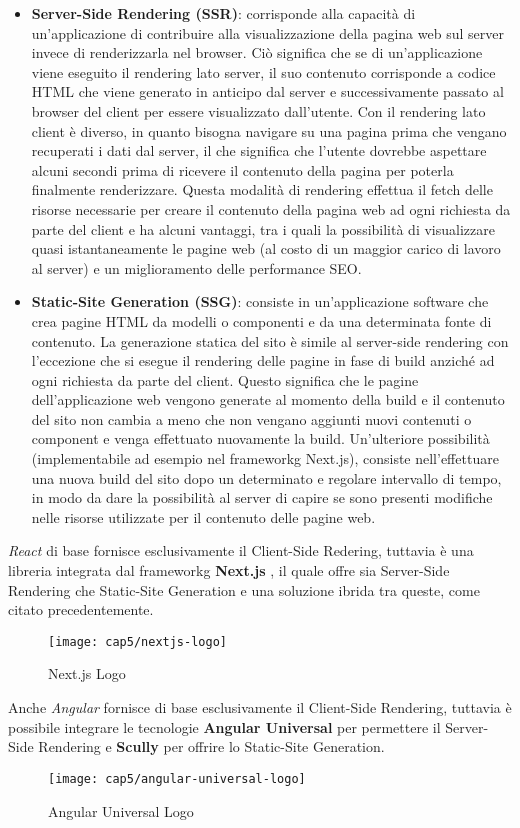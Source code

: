 \begin{itemize}
	\item \textbf{Server-Side Rendering (SSR)}: corrisponde alla capacità di un'applicazione di contribuire alla visualizzazione della pagina web sul server invece di renderizzarla nel browser. Ciò significa che se di un'applicazione viene eseguito il rendering lato server, il suo contenuto corrisponde a codice HTML che viene generato in anticipo dal server e successivamente passato al browser del client per essere visualizzato dall'utente. Con il rendering lato client è diverso, in quanto bisogna navigare su una pagina prima che vengano recuperati i dati dal server, il che significa che l'utente dovrebbe aspettare alcuni secondi prima di ricevere il contenuto della pagina per poterla finalmente renderizzare. Questa modalità di rendering effettua il fetch delle risorse necessarie per creare il contenuto della pagina web ad ogni richiesta da parte del client e ha alcuni vantaggi, tra i quali la possibilità di visualizzare quasi istantaneamente le pagine web (al costo di un maggior carico di lavoro al server) e un miglioramento delle performance SEO.
	\item \textbf{Static-Site Generation (SSG)}: consiste in un'applicazione software che crea pagine HTML da modelli o componenti e da una determinata fonte di contenuto. La generazione statica del sito è simile al server-side rendering con l'eccezione che si esegue il rendering delle pagine in fase di build anziché ad ogni richiesta da parte del client. Questo significa che le pagine dell'applicazione web vengono generate al momento della build e il contenuto del sito non cambia a meno che non vengano aggiunti nuovi contenuti o component e venga effettuato nuovamente la build. Un'ulteriore possibilità (implementabile ad esempio nel \gls{frameworkg} Next.js), consiste nell'effettuare una nuova build del sito dopo un determinato e regolare intervallo di tempo, in modo da dare la possibilità al server di capire se sono presenti modifiche nelle risorse utilizzate per il contenuto delle pagine web. \\
\end{itemize}
\textit{React} di base fornisce esclusivamente il Client-Side Redering, tuttavia è una libreria integrata dal \gls{frameworkg} \textbf{Next.js} , il quale offre sia Server-Side Rendering che Static-Site Generation e una soluzione ibrida tra queste, come citato precedentemente.
\begin{figure}[H] 
    \centering 
    \texttt{[image: cap5/nextjs-logo]} 
    \caption{Next.js Logo}
\end{figure}
\noindent Anche \textit{Angular} fornisce di base esclusivamente il Client-Side Rendering, tuttavia è possibile integrare le tecnologie \textbf{Angular Universal}  per permettere il Server-Side Rendering e \textbf{Scully}  per offrire lo Static-Site Generation.
\begin{figure}[!h] 
    \centering 
    \texttt{[image: cap5/angular-universal-logo]} 
    \caption{Angular Universal Logo}
\end{figure}

